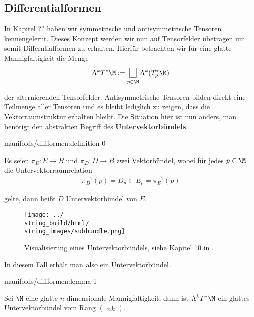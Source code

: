 \documentclass[letterpaper,10pt,german]{jupyterBook}
\begin{document}
\subsection{Differentialformen}
\label{\detokenize{manifolds/diffformen:differentialformen}}\label{\detokenize{manifolds/diffformen:s-difformen}}
\par
In Kapitel ?? haben wir symmetrische und antisymmetrische Tensoren kennengelernt. Dieses Konzept werden wir nun auf Tensorfelder übetragen um somit Differntialformen zu erhalten. Hierfür betrachten wir für eine glatte Mannigfaltigkeit die Menge
\begin{align*}
\Lambda^k T^\ast\M := \bigsqcup_{p\in\M} \Lambda^k (T^\ast_p\M)
\end{align*}
\par
der alternierenden Tensorfelder. Antisymmetrische Tensoren bilden direkt eine Teilmenge aller Tensoren und es bleibt lediglich zu zeigen, dass die Vektorraumstruktur erhalten bleibt. Die Situation hier ist nun anders, man benötigt den abstrakten Begriff des \textbf{Untervektorbündels}.
\begin{definition}{}{manifolds/diffformen:definition-0}



\par
Es seien \(\pi_E:E\to B\) und \(\pi_D:D\to B\) zwei Vektorbündel, wobei für jedes \(p\in\M\) die Untervektorraumrelation
\begin{align*}
\pi_D^{-1}(p) = D_p\subset E_p = \pi_E^{-1}(p)
\end{align*}
\par
gelte, dann heißt \(D\) Untervektorbündel von \(E\).
\end{definition}

\begin{figure}[htbp]
\centering


\noindent\texttt{[image: ../\\string\_build/html/\\string\_images/subbundle.png]}
\caption{Visualisierung eines Untervektorbündels, siehe Kapitel 10 in \cite{Lee03}.}\label{\detokenize{manifolds/diffformen:fig-subbundle}}\end{figure}

\par
In diesem Fall erhält man also ein Untervektorbündel.
\begin{lemma}{}{manifolds/diffformen:lemma-1}



\par
Sei \(\M\) eine glatte \(n\) dimensionale Mannigfaltigkeit, dann ist \(\Lambda^k T^\ast\M\) ein glattes Untervektorbündel vom Rang \(\begin{pmatrix} n k \end{pmatrix}\).
\end{lemma}
\end{document}
